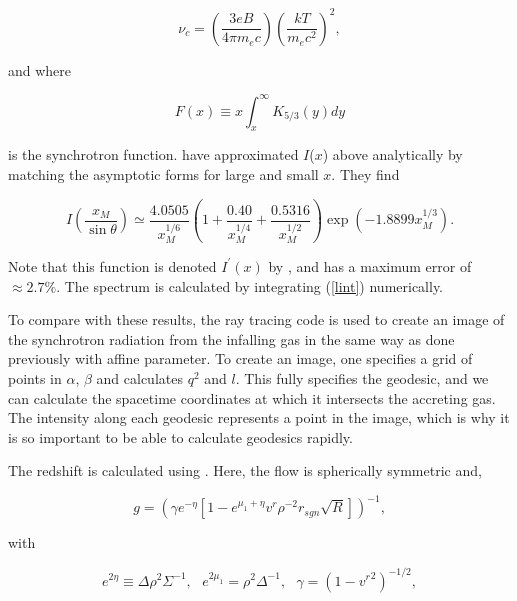 \documentclass[apj]{emulateapj}
\begin{document}
\begin{equation}
\nu_c = \left(\frac{3eB}{4 \pi m_e c}\right)\left(\frac{k T}{m_e c^2}\right)^2,
\end{equation}

\noindent and where

\begin{equation}
F(x) \equiv x \int_x^\infty K_{5/3}(y) dy
\end{equation}

\noindent is the synchrotron function. \citet{maha} have approximated $I$($x$) above analytically by matching the asymptotic forms for large and small $x$. They find

\begin{equation}
I \left ( \frac{x_M}{\sin{\theta}} \right) \simeq \frac{4.0505}{x_M^{1/6}} \left(1+\frac{0.40}{x_M^{1/4}}+\frac{0.5316}{x_M^{1/2}}\right)\exp(-1.8899x_M^{1/3}).
\end{equation}

\noindent Note that this function is denoted $I^\prime(x)$ by \citet{maha}, and has a maximum error of $\approx 2.7\%$. The spectrum is calculated by integrating (\ref{lint}) numerically.

To compare with these results, the ray tracing code is used to create an image of the synchrotron radiation from the infalling gas in the same way as done previously with affine parameter. To create an image, one specifies a grid of points in $\alpha$, $\beta$ and calculates $q^2$ and $l$. This fully specifies the geodesic, and we can calculate the spacetime coordinates at which it intersects the accreting gas. The intensity along each geodesic represents a point in the image, which is why it is so important to be able to calculate geodesics rapidly.

The redshift is calculated using \citet{viergutz1993}. Here, the flow is spherically symmetric and, 

\begin{equation}
  g = \left (\gamma e^{-\eta} [1 - e^{\mu_1+\eta} v^r \rho^{-2} r_{sgn} \sqrt{R}]\right)^{-1},
\end{equation}

\noindent with

\begin{equation}
 e^{2\eta} \equiv \Delta \rho^2 \Sigma^{-1}, \hspace{8pt} e^{2 \mu_1} = \rho^2 \Delta^{-1}, \hspace{8pt} \gamma=(1-{v^r}^2)^{-1/2},
\end{equation}
\end{document}
